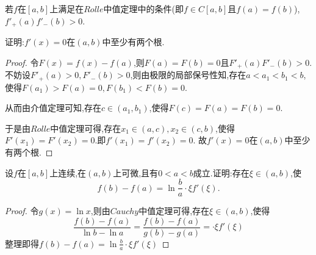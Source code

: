 \documentclass[lang=cn,newtx,10pt,scheme=chinese]{elegantbook}
\begin{document}
\begin{exercise}
    若$f$在$[a,b]$上满足在$Rolle$中值定理中的条件(即$f\in C[a,b]$且$f(a)=f(b)$),
$f'_+(a)f'_-(b)>0$.

证明:$f'(x)=0$在$(a,b)$中至少有两个根.

\begin{proof}
    令$F(x)=f(x)-f(a)$,则$F(a)=F(b)=0$且$F'_+(a)F'_-(b)>0$.不妨设$F'_+(a)>0,F'_-(b)>0$,则由极限的局部保号性知,存在$a<a_1<b_1<b$,使得$F(a_1)>F(a)=0,F(b_1)<F(b)=0$.
    
    从而由介值定理可知,存在$c\in(a_1,b_1)$,使得$F(c)=F(a)=F(b)=0$.

    于是由$Rolle$中值定理可得,存在$x_1\in(a,c),x_2\in(c,b)$,使得$F'(x_1)=F'(x_2)=0$.即$f'(x_1)=f'(x_2)=0$.
    故$f'(x)=0$在$(a,b)$中至少有两个根.
\end{proof}
\end{exercise}

\begin{exercise}
设$f$在$[a,b]$上连续,在$(a,b)$上可微,且有$0<a<b$成立.证明:存在$\xi\in(a,b)$,使
\begin{equation}
  f(b)-f(a)=\ln\frac{b}{a}\cdot\xi f'(\xi).
  \nonumber
\end{equation}
    \begin{proof}
        令$g(x)=\ln x$,则由$Cauchy$中值定理可得,存在$\xi\in(a,b)$,使得
        \begin{equation}
        \frac{f\left( b \right) -f\left( a \right)}{\ln b-\ln a}=\frac{f\left( b \right) -f\left( a \right)}{g\left( b \right) -g\left( a \right)}=\cdot\xi f'\left( \xi \right) 
            \nonumber
        \end{equation}
        整理即得$f\left( b \right) -f\left( a \right) =\ln \frac{b}{a}\cdot\xi f'\left( \xi \right) $
    \end{proof}
\end{exercise}
\end{document}
